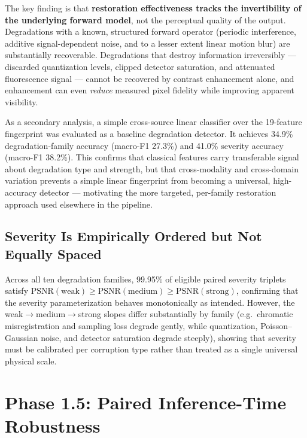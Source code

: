\documentclass[11pt]{article}
\begin{document}
The key finding is that \textbf{restoration effectiveness tracks the invertibility of
the underlying forward model}, not the perceptual quality of the output. Degradations
with a known, structured forward operator (periodic interference, additive
signal-dependent noise, and to a lesser extent linear motion blur) are substantially
recoverable. Degradations that destroy information irreversibly --- discarded
quantization levels, clipped detector saturation, and attenuated fluorescence
signal --- cannot be recovered by contrast enhancement alone, and enhancement can even
\emph{reduce} measured pixel fidelity while improving apparent visibility.

As a secondary analysis, a simple cross-source linear classifier over the 19-feature
fingerprint was evaluated as a baseline degradation detector. It achieves 34.9\%
degradation-family accuracy (macro-F1 27.3\%) and 41.0\% severity accuracy (macro-F1
38.2\%). This confirms that classical features carry transferable signal about
degradation type and strength, but that cross-modality and cross-domain variation
prevents a simple linear fingerprint from becoming a universal, high-accuracy detector
--- motivating the more targeted, per-family restoration approach used elsewhere in the
pipeline.

\subsection{Severity Is Empirically Ordered but Not Equally Spaced}

Across all ten degradation families, 99.95\% of eligible paired severity triplets
satisfy $\mathrm{PSNR}(\text{weak}) \geq \mathrm{PSNR}(\text{medium}) \geq
\mathrm{PSNR}(\text{strong})$, confirming that the severity parameterization behaves
monotonically as intended. However, the weak$\to$medium$\to$strong slopes differ
substantially by family (e.g.\ chromatic misregistration and sampling loss degrade
gently, while quantization, Poisson--Gaussian noise, and detector saturation degrade
steeply), showing that severity must be calibrated per corruption type rather than
treated as a single universal physical scale.

\section{Phase 1.5: Paired Inference-Time Robustness}
\end{document}
